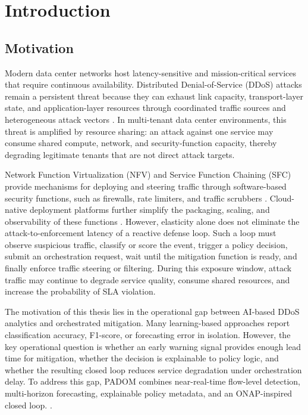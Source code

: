 \documentclass[12pt, a4paper, reqno, oneside]{book}
\begin{document}
\newpage

\tableofcontents
\newpage
\listoffigures
\newpage
\listoftables
\begingroup
\listofalgorithms
\let\clearpage\relax
\endgroup

\newpage
{}

\chapter{Introduction}
\label{ch:introduction}

\section{Motivation}
Modern data center networks host latency-sensitive and mission-critical
services that require continuous availability. Distributed Denial-of-Service
(DDoS) attacks remain a persistent threat because they can exhaust link
capacity, transport-layer state, and application-layer resources through
coordinated traffic sources and heterogeneous attack vectors
\cite{sharafaldin2019cicddos}. In multi-tenant data center environments, this
threat is amplified by resource sharing: an attack against one service
may consume shared compute, network, and security-function capacity, thereby
degrading legitimate tenants that are not direct attack targets.

Network Function Virtualization (NFV) and Service Function Chaining (SFC)
provide mechanisms for deploying and steering traffic through software-based
security functions, such as firewalls, rate limiters, and traffic scrubbers
\cite{etsi_nfv_architecture,sfc_rfc7665}. Cloud-native deployment platforms
further simplify the packaging, scaling, and observability of these functions
\cite{kubernetes_docs}. However, elasticity alone does not eliminate the
attack-to-enforcement latency of a reactive defense loop. Such a loop must
observe suspicious traffic, classify or score the event, trigger a policy
decision, submit an orchestration request, wait until the mitigation function
is ready, and finally enforce traffic steering or filtering. During this
exposure window, attack traffic may continue to degrade service quality,
consume shared resources, and increase the probability of SLA violation.

The motivation of this thesis lies in the operational gap between AI-based DDoS analytics and orchestrated mitigation. Many learning-based approaches report classification accuracy, F1-score, or forecasting error in isolation. However, the key operational question is whether an early warning signal provides enough lead time for mitigation, whether the decision is explainable to policy logic, and whether the resulting closed loop reduces service degradation under orchestration delay. To address this gap, PADOM combines near-real-time flow-level detection, multi-horizon forecasting, explainable policy metadata, and an ONAP-inspired closed loop. \cite{onap_docs}.
\end{document}
